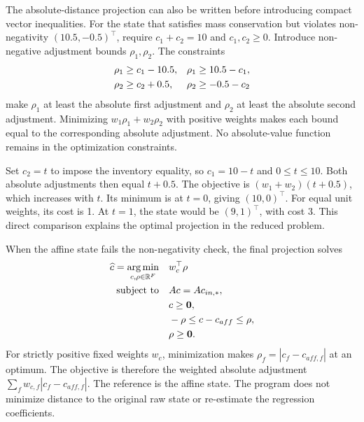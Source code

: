 The absolute-distance projection can also be written before introducing compact vector inequalities. For the state that satisfies mass conservation but violates non-negativity \((10.5,-0.5)^\top\), require \(c_1+c_2=10\) and \(c_1,c_2\geq0\). Introduce non-negative adjustment bounds \(\rho_1,\rho_2\). The constraints
\begin{equation}
\equationname{Absolute-adjustment bounds for an illustrative two-component projection}
\label{eq:icsor_scalar_absolute_constraints}
\begin{aligned}
\rho_1&\geq c_1-10.5,&\rho_1&\geq10.5-c_1,\\
\rho_2&\geq c_2+0.5,&\rho_2&\geq-0.5-c_2
\end{aligned}
\end{equation}
make \(\rho_1\) at least the absolute first adjustment and \(\rho_2\) at least the absolute second adjustment. Minimizing \(w_1\rho_1+w_2\rho_2\) with positive weights makes each bound equal to the corresponding absolute adjustment. No absolute-value function remains in the optimization constraints.

Set \(c_2=t\) to impose the inventory equality, so \(c_1=10-t\) and \(0\leq t\leq10\). Both absolute adjustments then equal \(t+0.5\). The objective is \((w_1+w_2)(t+0.5)\), which increases with \(t\). Its minimum is at \(t=0\), giving \((10,0)^\top\). For equal unit weights, its cost is 1. At \(t=1\), the state would be \((9,1)^\top\), with cost 3. This direct comparison explains the optimal projection in the reduced problem.

When the affine state fails the non-negativity check, the final projection solves
\begin{equation}
\equationname{Weighted absolute-distance projection for mass conservation and non-negativity}
\label{eq:icsor_weighted_correction}
\begin{aligned}
\widehat c =\mathop{\arg\min}_{c,\rho\in\mathbb{R}^{F}}\quad
& w_c^\top\rho\\
\text{subject to}\quad
& Ac=Ac_{in,*},\\
& c\geq\mathbf{0},\\
& -\rho\leq c-c_{aff}\leq\rho,\\
& \rho\geq\mathbf{0}.
\end{aligned}
\end{equation}
For strictly positive fixed weights \(w_c\), minimization makes \(\rho_f=|c_f-c_{aff,f}|\) at an optimum. The objective is therefore the weighted absolute adjustment \(\sum_f w_{c,f}|c_f-c_{aff,f}|\). The reference is the affine state. The program does not minimize distance to the original raw state or re-estimate the regression coefficients.

